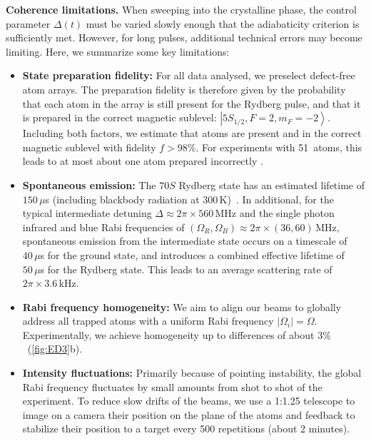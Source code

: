 \documentclass[prl,nobalancelastpage,twocolumn,superscriptaddress,nofootinbib]{revtex4}
\newcommand{\ket}[1]{\left|#1\right\rangle}
\begin{document}
\begin{footnotesize}
\noindent
\textbf{Coherence limitations.}
When sweeping into the crystalline phase, the control parameter $\Delta(t)$
must be varied slowly enough that the adiabaticity criterion is sufficiently
met. However, for long pulses, additional technical errors may become limiting.
Here, we summarize some key limitations:
\begin{itemize}
  \item \textbf{State preparation fidelity:} For all data analysed, we
      preselect defect-free atom arrays. The preparation fidelity is therefore
      given by the probability that each atom in the array is still present for
      the Rydberg pulse, and that it is prepared in the correct magnetic
      sublevel: $\ket{5S_{1/2}, F=2, m_F = -2}$. Including both factors, we
      estimate that atoms are present and in the correct magnetic sublevel with
      fidelity $f > 98\%$. For experiments with 51~atoms, this leads to
      at most about one atom prepared incorrectly .

\item \textbf{Spontaneous emission:} The $70S$ Rydberg state has an estimated
    lifetime of $150\,\mu$s (including blackbody radiation at
    $300\,$K)~\cite{Beterov2009}. In additional, for the typical intermediate
    detuning $\Delta \approx 2\pi \times 560\,$MHz and the single photon infrared and
    blue Rabi frequencies of $(\Omega_R, \Omega_B) \approx 2\pi \times (36,
    60)\,$MHz, spontaneous emission from the intermediate state occurs on a
    timescale of $40\,\mu$s for the ground state, and introduces a combined
    effective lifetime of $50\,\mu$s for the Rydberg state. This leads to an
    average scattering rate of $2\pi\times3.6\,$kHz.

  \item \textbf{Rabi frequency homogeneity:} We aim to align our beams to
      globally address all trapped atoms with a uniform Rabi frequency $\lvert
      \Omega_i \rvert= \Omega$. Experimentally, we achieve homogeneity up to
      differences of about $3\%$~(\ref{fig:ED3}b).


  \item \textbf{Intensity fluctuations:} Primarily because of pointing
      instability, the global Rabi frequency fluctuates by small amounts from
      shot to shot of the experiment. To reduce slow drifts of the
      beams, we use a 1:1.25 telescope to image on a camera their position on
      the plane of the atoms and feedback to stabilize their position to a
      target every 500 repetitions (about 2 minutes). 



\end{itemize}
\end{footnotesize}
\end{document}
